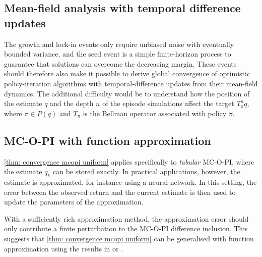 \subsection{Mean-field analysis with temporal difference updates}
\label{sec: discussion temporal difference}

The growth and lock-in events only require unbiased noise with eventually bounded variance, and the seed event is a simple finite-horizon process to guarantee that solutions can overcome the decreasing margin.
These events should therefore also make it possible to derive global convergence of optimistic policy-iteration algorithms with temporal-difference updates from their mean-field dynamics.
The additional difficulty would be to understand how the position of the estimate $q$ and the depth $n$ of the episode simulations affect the target $T_{\pi}^n q$, where $\pi \in P(q)$ and $T_\pi$ is the Bellman operator associated with policy $\pi$.


\subsection{MC-O-PI with function approximation}
\label{sec: discussion function approximation}

\autoref{thm: convergence mcopi uniform} applies specifically to \textit{tabular} MC-O-PI, where the estimate $q_k$ can be stored exactly.
In practical applications, however, the estimate is approximated, for instance using a neural network.
In this setting, the error between the observed return and the current estimate is then used to update the parameters of the approximation.

With a sufficiently rich approximation method,
the approximation error should only contribute a finite perturbation to the MC-O-PI difference inclusion.
This suggests that \autoref{thm: convergence mcopi uniform}
can be generalised with function approximation using the results in \citep[Section~4.3.3]{Bertsekas1996Neuro-DynamicProgramming} or \citep[Section~5.2]{Kushner2003StochasticApplications}.

